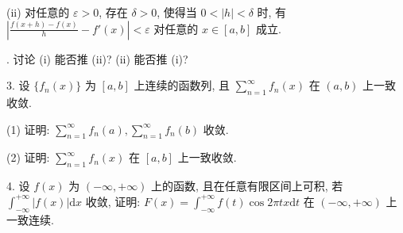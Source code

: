 \documentclass{examcollection}
\begin{document}
{\begin{minipage}{\textwidth}
(ii) 对任意的 $\varepsilon > 0$, 存在 $\delta > 0$, 使得当 $0 < |h| < \delta$ 时, 有 $\left|\frac{f(x + h) - f(x)}{h} - f'(x)\right| < \varepsilon$ 对任意的 $x \in [a, b]$ 成立.\par
. 讨论 (i) 能否推 (ii)? (ii) 能否推 (i)?\par
3. 设 $\{f_n(x)\}$ 为 $[a, b]$ 上连续的函数列, 且 $\sum_{n=1}^{\infty} f_n(x)$ 在 $(a, b)$ 上一致收敛.\par
(1) 证明: $\sum_{n=1}^{\infty} f_n(a), \sum_{n=1}^{\infty} f_n(b)$ 收敛.\par
(2) 证明: $\sum_{n=1}^{\infty} f_n(x)$ 在 $[a, b]$ 上一致收敛.\par
4. 设 $f(x)$ 为 $(- \infty, + \infty)$ 上的函数, 且在任意有限区间上可积, 若 $\int_{-\infty}^{+\infty}|f(x)|\mathrm{d}x$ 收敛, 证明: $F(x) = \int_{-\infty}^{+\infty}f(t)\cos 2\pi tx\mathrm{d}t$ 在 $(- \infty, + \infty)$ 上一致连续.\par
\end{minipage}}
\ifdim\dimexpr\ht\proofbox+\dp\proofbox\relax>\textheight
\noindent\resizebox{!}{\textheight}{\usebox{\proofbox}}\else\noindent\usebox{\proofbox}\fi\clearpage
\end{document}
